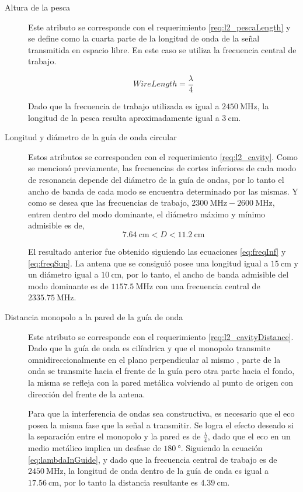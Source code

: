 \begin{description}
  \item[Altura de la pesca] Este atributo se corresponde con el requerimiento \ref{req:l2_pescaLength} y se define como la cuarta parte de la longitud de onda de la señal transmitida en espacio libre. En este caso se utiliza la frecuencia central de trabajo.

  \begin{equation}
  WireLength = \dfrac{\lambda}{4}
  \end{equation}

Dado que la frecuencia de trabajo utilizada es igual a $\SI{2450}{\MHz}$, la longitud de la pesca resulta aproximadamente igual a $\SI{3}{\centi\meter}$.

  \item[Longitud y diámetro de la guía de onda circular] Estos atributos se corresponden con el requerimiento \ref{req:l2_cavity}. Como se mencionó previamente, las frecuencias de cortes inferiores de cada modo de resonancia depende del diámetro de la guía de ondas, por lo tanto el ancho de banda de cada modo se encuentra determinado por las mismas. Y como se desea que las frecuencias de trabajo, $\SI{2300}{\MHz} - \SI{2600}{\MHz}$, entren dentro del modo dominante, el diámetro máximo y mínimo admisible es de,
  \begin{equation}
  \SI{7.64}{\centi\meter} < D < \SI{11.2}{\centi\meter}
  \end{equation}

  El resultado anterior fue obtenido siguiendo las ecuaciones \ref{eq:freqInf} y \ref{eq:freqSup}. La antena que se consiguió posee una longitud igual a $\SI{15}{\centi\meter}$ y un diámetro igual a $\SI{10}{\centi\meter}$, por lo tanto, el ancho de banda admisible del modo dominante es de $\SI{1157.5}{\MHz}$ con una frecuencia central de $\SI{2335.75}{\MHz}$.

  \item[Distancia monopolo a la pared de la guía de onda] Este atributo se corresponde con el requerimiento \ref{req:l2_cavityDistance}. Dado que la guía de onda es cilíndrica y que el monopolo transmite omnidireccionalmente en el plano perpendicular al mismo \cite{arrl2007}, parte de la onda se transmite hacia el frente de la guía pero otra parte hacia el fondo, la misma se refleja con la pared metálica volviendo al punto de origen con dirección del frente de la antena.

  Para que la interferencia de ondas sea constructiva, es necesario que el eco posea la misma fase que la señal a transmitir. Se logra el efecto deseado si la separación entre el monopolo y la pared es de $\frac{\lambda}{4}$, dado que el eco en un medio metálico implica un desfase de $\SI{180}{\degree}$. Siguiendo la ecuación \ref{eq:lambdaInGuide}, y dado que la frecuencia central de trabajo es de $\SI{2450}{\MHz}$, la longitud de onda dentro de la guía de onda es igual a $\SI{17.56}{\centi\meter}$, por lo tanto la distancia resultante es $\SI{4.39}{\centi\meter}$.

\end{description}

